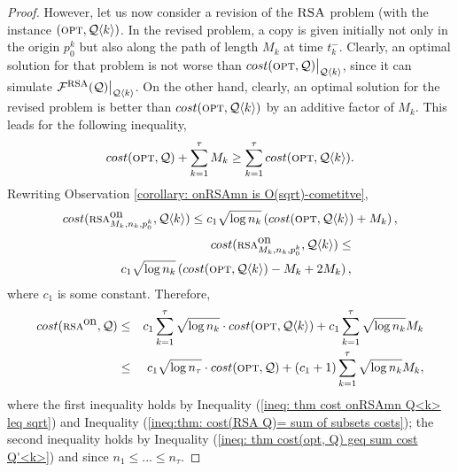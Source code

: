 \documentclass[11pt]{article}
\newcommand{\RSA}{\mbox{\sc RSA}}
\newcommand{\cost}[0]{cost}
\newcommand{\lrangle}[1]{\langle #1\rangle}
\newcommand{\calF}{\mathcal{F}}
\newcommand{\calQ}{\mathcal{Q}}
\newcommand{\opt}{\mbox{\textsc{opt}}}
\newcommand{\onRSAmnk}[1]{\mbox{\sc rsa}^{\mbox{\upshape on}}_{\MM_{#1},\nn_{#1},p_0^{#1}}}
\newcommand{\onRSA}{\mbox{\sc rsa}^{\mbox{\upshape on}}}
\newcommand{\MM}[0]{M}
\newcommand{\nn}{n}
\newcommand{\FRSAQ}[0]{\calF^{\mbox{\sc rsa}}(\calQ)}
\begin{document}
{\begin{proof}
However, let us now consider a revision of the $\RSA$ problem (with the instance
$(\opt,\calQ\lrangle{k})$. In the revised problem, a copy is given initially not only in the origin $p_0^k$ but also along the path of length $M_k$ at time $t_k^-$. Clearly, an optimal solution for that problem is not worse than
$\cost(\opt, \calQ) \big|_{\calQ\lrangle{k}}$, since it can simulate
 $\FRSAQ \big|_{\calQ\lrangle{k}}$. On the other
hand, clearly, an optimal solution for the revised problem is better than
$\cost(\opt, \calQ\lrangle{k})$ by an additive factor of $M_k$.
This leads for the following inequality,
\begin{eqnarray}
\cost(\opt,\calQ) + \sum_{k=1}^{\tau} \MM_k \geq \sum_{k=1}^{\tau} \cost(\opt,\calQ\lrangle{k}).
\label{ineq: thm cost(opt, Q) geq sum cost Q'<k>}
\end{eqnarray}
Rewriting  Observation \ref{corollary: onRSAmn is O(sqrt)-cometitve},
\commsingle
\begin{eqnarray}
\cost(\onRSAmnk{k},\calQ\lrangle{k})\leq c_1\sqrt{\log \nn_k}\left( \cost(\opt,\calQ\lrangle{k}) + \MM_k\right),
\label{ineq: thm cost onRSAmn Q<k> leq sqrt}
\end{eqnarray}
\commsingleend
\commdouble
\begin{eqnarray}
&&\cost(\onRSAmnk{k},\calQ\lrangle{k})\leq \\
&&c_1\sqrt{\log \nn_k}\left( \cost(\opt,\calQ\lrangle{k})-\MM_k+2\MM_k\right),
\label{ineq: thm cost onRSAmn Q<k> leq sqrt}
\end{eqnarray}
\commdoubleend
where $c_1$ is some constant.
Therefore,
\commsingle
\begin{eqnarray}
\cost(\onRSA,\calQ)
&\leq&\nonumber
c_1\sum_{k=1}^{\tau}\sqrt{\log \nn_k}\cdot\cost(\opt,\calQ\lrangle{k})+ c_1\sum_{k=1}^{\tau}\sqrt{\log \nn_k} \MM_k\\
&\leq&
c_1\sqrt{\log \nn_\tau}\cdot\cost(\opt,\calQ)+ (c_1+1)\sum_{k=1}^{\tau}\sqrt{\log \nn_k} \MM_k,
\label{ineq:thm: cost (SRSA,Q) leq sqrt opt Q + sum log nk mk}
\end{eqnarray}
\commsingleend
where the first inequality holds by Inequality (\ref{ineq: thm cost onRSAmn Q<k> leq sqrt}) and Inequality (\ref{ineq:thm: cost(RSA Q)= sum of subsets costs});
the second inequality holds by Inequality (\ref{ineq: thm cost(opt, Q) geq sum cost Q'<k>}) and since $\nn_1\leq...\leq \nn_{\tau}$.















\end{proof}}
\end{document}
